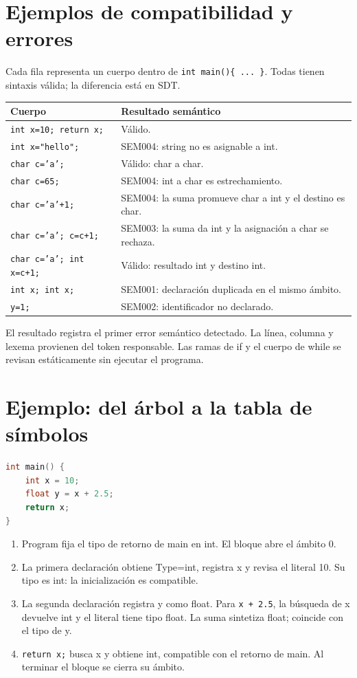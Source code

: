 \section*{Ejemplos de compatibilidad y errores}
Cada fila representa un cuerpo dentro de \texttt{int main()\{ ... \}}. Todas tienen sintaxis válida; la diferencia está en SDT.
{\small\begin{longtable}{@{}p{7.5cm}p{8.1cm}@{}}\toprule Cuerpo & Resultado semántico\\\midrule\endhead
\texttt{int x=10; return x;} & Válido.\\
\texttt{int x="hello";} & SEM004: string no es asignable a int.\\
\texttt{char c='a';} & Válido: char a char.\\
\texttt{char c=65;} & SEM004: int a char es estrechamiento.\\
\texttt{char c='a'+1;} & SEM004: la suma promueve char a int y el destino es char.\\
\texttt{char c='a'; c=c+1;} & SEM003: la suma da int y la asignación a char se rechaza.\\
\texttt{char c='a'; int x=c+1;} & Válido: resultado int y destino int.\\
\texttt{int x; int x;} & SEM001: declaración duplicada en el mismo ámbito.\\
\texttt{y=1;} & SEM002: identificador no declarado.\\\bottomrule\end{longtable}}
El resultado registra el primer error semántico detectado. La línea, columna y lexema provienen del token responsable. Las ramas de if y el cuerpo de while se revisan estáticamente sin ejecutar el programa.

\section*{Ejemplo: del árbol a la tabla de símbolos}
\begin{lstlisting}[language=C]
int main() {
    int x = 10;
    float y = x + 2.5;
    return x;
}
\end{lstlisting}
\begin{enumerate}
\item Program fija el tipo de retorno de main en int. El bloque abre el ámbito 0.
\item La primera declaración obtiene Type=int, registra x y revisa el literal 10. Su tipo es int: la inicialización es compatible.
\item La segunda declaración registra y como float. Para \texttt{x + 2.5}, la búsqueda de x devuelve int y el literal tiene tipo float. La suma sintetiza float; coincide con el tipo de y.
\item \texttt{return x;} busca x y obtiene int, compatible con el retorno de main. Al terminar el bloque se cierra su ámbito.
\end{enumerate}

